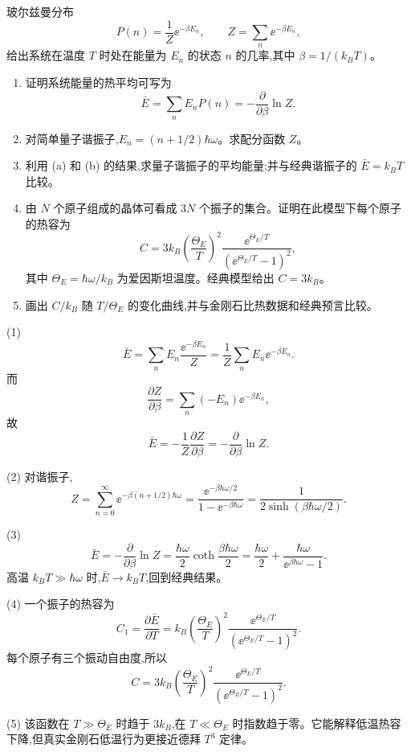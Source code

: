 \begin{question}
玻尔兹曼分布
\[
P(n)=\frac{1}{Z}\ee^{-\beta E_n},\qquad Z=\sum_n \ee^{-\beta E_n},
\]
给出系统在温度 $T$ 时处在能量为 $E_n$ 的状态 $n$ 的几率,其中 $\beta=1/(k_BT)$。
\begin{enumerate}
\item 证明系统能量的热平均可写为
\[
\bar E=\sum_n E_nP(n)=-\frac{\partial}{\partial\beta}\ln Z .
\]
\item 对简单量子谐振子,$E_n=(n+1/2)\hbar\omega$。求配分函数 $Z$。
\item 利用 (a) 和 (b) 的结果,求量子谐振子的平均能量;并与经典谐振子的 $\bar E=k_BT$ 比较。
\item 由 $N$ 个原子组成的晶体可看成 $3N$ 个振子的集合。证明在此模型下每个原子的热容为
\[
C=3k_B\left(\frac{\Theta_E}{T}\right)^2\frac{\ee^{\Theta_E/T}}{(\ee^{\Theta_E/T}-1)^2},
\]
其中 $\Theta_E=\hbar\omega/k_B$ 为爱因斯坦温度。经典模型给出 $C=3k_B$。
\item 画出 $C/k_B$ 随 $T/\Theta_E$ 的变化曲线,并与金刚石比热数据和经典预言比较。
\end{enumerate}
\end{question}
\begin{solution}
(1) 
\[
\bar E=\sum_nE_n\frac{\ee^{-\beta E_n}}{Z}
=\frac1Z\sum_nE_n\ee^{-\beta E_n}.
\]
而
\[
\frac{\partial Z}{\partial\beta}=\sum_n(-E_n)\ee^{-\beta E_n},
\]
故
\[
\bar E=-\frac1Z\frac{\partial Z}{\partial\beta}
=-\frac{\partial}{\partial\beta}\ln Z.
\]

(2) 对谐振子,
\[
Z=\sum_{n=0}^{\infty}\ee^{-\beta(n+1/2)\hbar\omega}
=\frac{\ee^{-\beta\hbar\omega/2}}{1-\ee^{-\beta\hbar\omega}}
=\frac1{2\sinh(\beta\hbar\omega/2)}.
\]

(3) 
\[
\bar E=-\frac{\partial}{\partial\beta}\ln Z
=\frac{\hbar\omega}{2}\coth\frac{\beta\hbar\omega}{2}
=\frac{\hbar\omega}{2}+\frac{\hbar\omega}{\ee^{\beta\hbar\omega}-1}.
\]
高温 $k_BT\gg\hbar\omega$ 时,$\bar E\to k_BT$,回到经典结果。

(4) 一个振子的热容为
\[
C_1=\frac{\partial\bar E}{\partial T}
=k_B\left(\frac{\Theta_E}{T}\right)^2
\frac{\ee^{\Theta_E/T}}{(\ee^{\Theta_E/T}-1)^2}.
\]
每个原子有三个振动自由度,所以
\[
C=3k_B\left(\frac{\Theta_E}{T}\right)^2
\frac{\ee^{\Theta_E/T}}{(\ee^{\Theta_E/T}-1)^2}.
\]

(5) 该函数在 $T\gg\Theta_E$ 时趋于 $3k_B$,在 $T\ll\Theta_E$ 时指数趋于零。它能解释低温热容下降,但真实金刚石低温行为更接近德拜 $T^3$ 定律。
\end{solution}

